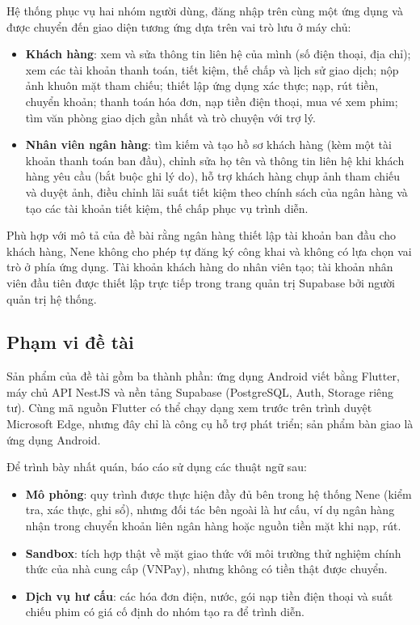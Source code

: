 Hệ thống phục vụ hai nhóm người dùng, đăng nhập trên cùng một ứng dụng và được chuyển đến giao diện tương ứng dựa trên vai trò lưu ở máy chủ:
\begin{itemize}
	\item \textbf{Khách hàng}: xem và sửa thông tin liên hệ của mình (số điện thoại, địa chỉ); xem các tài khoản thanh toán, tiết kiệm, thế chấp và lịch sử giao dịch; nộp ảnh khuôn mặt tham chiếu; thiết lập ứng dụng xác thực; nạp, rút tiền, chuyển khoản; thanh toán hóa đơn, nạp tiền điện thoại, mua vé xem phim; tìm văn phòng giao dịch gần nhất và trò chuyện với trợ lý.
	\item \textbf{Nhân viên ngân hàng}: tìm kiếm và tạo hồ sơ khách hàng (kèm một tài khoản thanh toán ban đầu), chỉnh sửa họ tên và thông tin liên hệ khi khách hàng yêu cầu (bắt buộc ghi lý do), hỗ trợ khách hàng chụp ảnh tham chiếu và duyệt ảnh, điều chỉnh lãi suất tiết kiệm theo chính sách của ngân hàng và tạo các tài khoản tiết kiệm, thế chấp phục vụ trình diễn.
\end{itemize}

Phù hợp với mô tả của đề bài rằng ngân hàng thiết lập tài khoản ban đầu cho khách hàng, Nene không cho phép tự đăng ký công khai và không có lựa chọn vai trò ở phía ứng dụng. Tài khoản khách hàng do nhân viên tạo; tài khoản nhân viên đầu tiên được thiết lập trực tiếp trong trang quản trị Supabase bởi người quản trị hệ thống.

\subsection{Phạm vi đề tài}

Sản phẩm của đề tài gồm ba thành phần: ứng dụng Android viết bằng Flutter, máy chủ API NestJS và nền tảng Supabase (PostgreSQL, Auth, Storage riêng tư). Cùng mã nguồn Flutter có thể chạy dạng xem trước trên trình duyệt Microsoft Edge, nhưng đây chỉ là công cụ hỗ trợ phát triển; sản phẩm bàn giao là ứng dụng Android.

Để trình bày nhất quán, báo cáo sử dụng các thuật ngữ sau:
\begin{itemize}
	\item \textbf{Mô phỏng}: quy trình được thực hiện đầy đủ bên trong hệ thống Nene (kiểm tra, xác thực, ghi sổ), nhưng đối tác bên ngoài là hư cấu, ví dụ ngân hàng nhận trong chuyển khoản liên ngân hàng hoặc nguồn tiền mặt khi nạp, rút.
	\item \textbf{Sandbox}: tích hợp thật về mặt giao thức với môi trường thử nghiệm chính thức của nhà cung cấp (VNPay), nhưng không có tiền thật được chuyển.
	\item \textbf{Dịch vụ hư cấu}: các hóa đơn điện, nước, gói nạp tiền điện thoại và suất chiếu phim có giá cố định do nhóm tạo ra để trình diễn.
\end{itemize}

